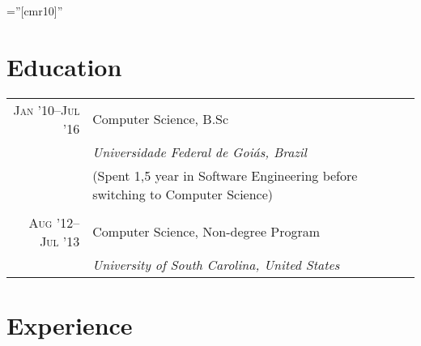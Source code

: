 \documentclass[a4paper,10pt]{article}
\begin{document}
\font\fb=''[cmr10]''


\section{Education}

\begin{tabular}{r|p{11cm}}

  \textsc{Jan '10--Jul '16} & Computer Science, B.Sc\\ &
  \emph{Universidade Federal de Goiás, Brazil} \\ &
  \footnotesize{(Spent 1,5 year in Software Engineering before switching to
  Computer Science)}
  \\\multicolumn{2}{c}{} \\

  \textsc{Aug '12--Jul '13} & Computer Science, Non-degree Program \\ &
  \emph{University of South Carolina, United States}\\
 
\end{tabular}

\section{Experience}

\setlength{\LTpre}{0pt}
\setlength{\LTpost}{0pt}
\end{document}
